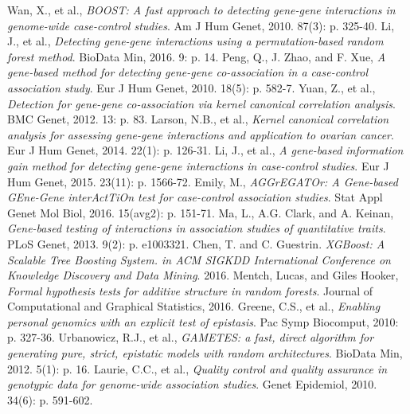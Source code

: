 \documentclass[11pt]{article}
\theoremstyle{plain}
\theoremstyle{definition}
\theoremstyle{remark}
\begin{document}
\begin{thebibliography}{9}
Wan, X., et al., {\em BOOST: A fast approach to detecting gene-gene interactions in genome-wide case-control studies}. Am J Hum Genet, 2010. 87(3): p. 325-40.
Li, J., et al., {\em Detecting gene-gene interactions using a permutation-based random forest method}. BioData Min, 2016. 9: p. 14.
Peng, Q., J. Zhao, and F. Xue, {\em A gene-based method for detecting gene-gene co-association in a case-control association study}. Eur J Hum Genet, 2010. 18(5): p. 582-7.
Yuan, Z., et al., {\em Detection for gene-gene co-association via kernel canonical correlation analysis}. BMC Genet, 2012. 13: p. 83.
Larson, N.B., et al., {\em Kernel canonical correlation analysis for assessing gene-gene interactions and application to ovarian cancer}. Eur J Hum Genet, 2014. 22(1): p. 126-31.
Li, J., et al., {\em A gene-based information gain method for detecting gene-gene interactions in case-control studies}. Eur J Hum Genet, 2015. 23(11): p. 1566-72.
Emily, M., {\em AGGrEGATOr: A Gene-based GEne-Gene interActTiOn test for case-control association studies}. Stat Appl Genet Mol Biol, 2016. 15(avg2): p. 151-71.
Ma, L., A.G. Clark, and A. Keinan, {\em Gene-based testing of interactions in association studies of quantitative traits}. PLoS Genet, 2013. 9(2): p. e1003321.
Chen, T. and C. Guestrin. {\em XGBoost: A Scalable Tree Boosting System. in ACM SIGKDD International Conference on Knowledge Discovery and Data Mining}. 2016.
Mentch, Lucas, and Giles Hooker, {\em Formal hypothesis tests for additive structure in random forests}. Journal of Computational and Graphical Statistics, 2016.
Greene, C.S., et al., {\em Enabling personal genomics with an explicit test of epistasis}. Pac Symp Biocomput, 2010: p. 327-36.
Urbanowicz, R.J., et al., {\em GAMETES: a fast, direct algorithm for generating pure, strict, epistatic models with random architectures}. BioData Min, 2012. 5(1): p. 16.
Laurie, C.C., et al., {\em Quality control and quality assurance in genotypic data for genome-wide association studies}. Genet Epidemiol, 2010. 34(6): p. 591-602.



\end{thebibliography}
\end{document}
